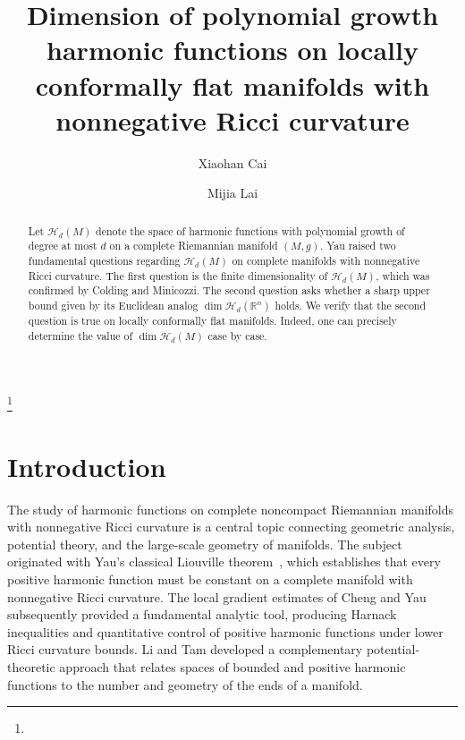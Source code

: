 \documentclass[12pt]{amsart}
\theoremstyle{plain}
\theoremstyle{definition}
\theoremstyle{remark}     %
\numberwithin{equation}{section}
\begin{document}
\title[Dimension of polynomial growth harmonic functions]{Dimension of polynomial growth harmonic functions on locally conformally flat manifolds with nonnegative Ricci curvature}
\author{Xiaohan Cai}
\address{School of Mathematical Sciences, Shanghai Jiao Tong University, Shanghai 200240, China}
\author{Mijia Lai}
\address{School of Mathematical Sciences, Shanghai Jiao Tong University, Shanghai 200240, China}

\thanks{}


\begin{abstract}
Let $\mathcal{H}_d(M)$ denote the space of harmonic functions with polynomial growth of degree at most $d$ on a complete Riemannian manifold $(M,g)$. Yau raised two fundamental questions regarding $\mathcal{H}_d(M)$ on complete manifolds with nonnegative Ricci curvature. The first question is the finite dimensionality of $\mathcal{H}_d(M)$, which was confirmed by Colding and Minicozzi. The second question asks whether a sharp upper bound given by its Euclidean analog  $\operatorname{dim}\mathcal{H}_{d}(\mathbb{R}^n)$ holds. We verify that the second question is true on locally conformally flat manifolds. Indeed, one can precisely determine the value of $\dim \mathcal{H}_d(M)$ case by case. 
\end{abstract}
\maketitle
\section{Introduction}

The study of harmonic functions on complete noncompact Riemannian manifolds with nonnegative Ricci curvature is a central topic connecting geometric analysis, potential theory, and the large-scale geometry of manifolds. The subject originated with Yau’s classical Liouville theorem~\cite{Y1}, which establishes that every positive harmonic function must be constant on a complete manifold with nonnegative Ricci curvature.  The local gradient estimates of Cheng and Yau~\cite{CY} subsequently  provided a fundamental analytic tool, producing Harnack inequalities and quantitative control of positive harmonic functions under lower Ricci curvature bounds. Li and Tam \cite{LT0, LT3} developed a complementary potential-theoretic approach that relates spaces of bounded and positive harmonic functions to the number and geometry of the ends of a manifold. 
\end{document}
